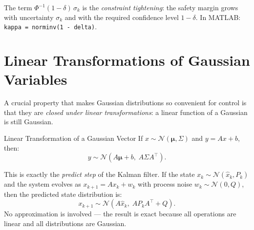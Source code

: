 The term $\Phi^{-1}(1-\delta)\,\sigma_k$ is the \emph{constraint tightening}: the safety margin grows with uncertainty $\sigma_k$ and with the required confidence level $1-\delta$. In MATLAB: \texttt{kappa = norminv(1 - delta)}.

\section{Linear Transformations of Gaussian Variables}
\label{sec:app_linear_gauss}

A crucial property that makes Gaussian distributions so convenient for
control is that they are \emph{closed under linear transformations}: a
linear function of a Gaussian is still Gaussian.

\begin{defnbox}{Linear Transformation of a Gaussian Vector}
If $x \sim \mathcal{N}(\boldsymbol{\mu}, \Sigma)$ and
$y = Ax + b$, then:
\[
  y \sim \mathcal{N}\!\left(
    A\boldsymbol{\mu} + b,\;
    A\Sigma A^\top
  \right).
\]
\end{defnbox}

This is exactly the \emph{predict step} of the Kalman filter.  If
the state $x_k \sim \mathcal{N}(\hat{x}_k, P_k)$
and the system evolves as $x_{k+1} = Ax_k +
w_k$ with process noise
$w_k \sim \mathcal{N}(0, Q)$, then the predicted
state distribution is:
\[
  x_{k+1} \sim \mathcal{N}\!\left(
    A\hat{x}_k,\;
    A P_k A^\top + Q
  \right).
\]
No approximation is involved — the result is exact because all
operations are linear and all distributions are Gaussian.

